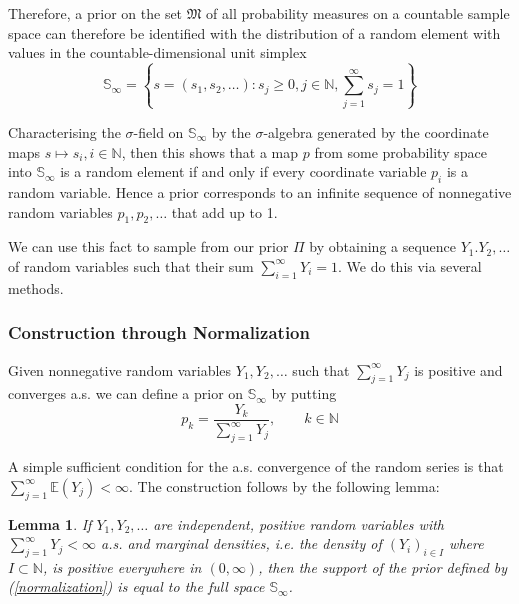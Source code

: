 \documentclass[a4paper,11pt]{article}
\theoremstyle{theorem}
\newtheorem{lem}{Lemma}[section]
\theoremstyle{definition}
\providecommand{\E}{\mathbb{E}}
\begin{document}
Therefore, a prior on the set $\mathfrak{M}$ of all probability measures on a countable sample space can therefore be identified with the distribution of a random element with values in the countable-dimensional unit simplex
\begin{equation}
\mathbb{S}_{\infty} = \left\lbrace s = (s_1, s_2, \dotsc): s_j \geq 0, j \in \mathbb{N}, \sum_{j=1}^{\infty}{s_j} = 1\right\rbrace
\end{equation}

Characterising the $\sigma$-field on $\mathbb{S}_{\infty}$ by the $\sigma$-algebra generated by the coordinate maps $s \mapsto s_{i}, i \in \mathbb{N}$, then this shows that a map $p$ from some probability space into $\mathbb{S}_{\infty}$ is a random element if and only if every coordinate variable $p_{i}$ is a random variable. Hence a prior corresponds to an infinite sequence of nonnegative random variables $p_1, p_2, \dotsc$ that add up to 1.

We can use this fact to sample from our prior $\Pi$ by obtaining a sequence $Y_1. Y_2, \dotsc$ of random variables such that their sum $\sum_{i=1}^{\infty}{Y_{i}} = 1$. We do this via several methods.

\subsubsection{Construction through Normalization}

Given nonnegative random variables $Y_1, Y_2, \dotsc$ such that $\sum_{j=1}^{\infty}{Y_j}$ is positive and converges a.s. we can define a prior on $\mathbb{S}_{\infty}$ by putting
\begin{equation} \label{normalization}
p_k = \frac{Y_k}{\sum_{j=1}^{\infty}{Y_j}}, \qquad k \in \mathbb{N}
\end{equation}

A simple sufficient condition for the a.s. convergence of the random series is that $\sum_{j=1}^{\infty}{\E (Y_j)} < \infty$. The construction follows by the following lemma:

\begin{lem}
If $Y_1, Y_2, \dotsc$ are independent, positive random variables with $\sum_{j=1}^{\infty}{Y_j} < \infty$ a.s. and marginal densities, i.e. the density of $(Y_i)_{i \in I}$ where $I \subset \mathbb{N}$, is positive everywhere in $(0, \infty)$, then the support of the prior defined by (\ref{normalization}) is equal to the full space $\mathbb{S}_\infty$. 
\end{lem}  
\end{document}
